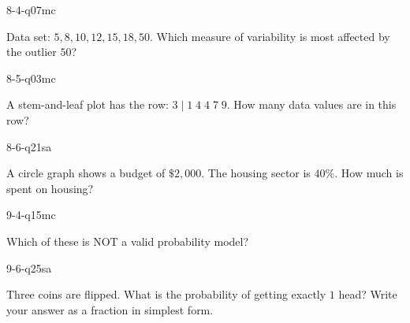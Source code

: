 \begin{practiceQuestion}{8-4-q07}{mc}
\begin{questionText}
Data set: $5, 8, 10, 12, 15, 18, 50$. Which measure of variability is most affected by the outlier $50$?
\end{questionText}
\end{practiceQuestion}

\begin{practiceQuestion}{8-5-q03}{mc}
\begin{questionText}
A stem-and-leaf plot has the row: $3 \mid 1\;4\;4\;7\;9$. How many data values are in this row?
\end{questionText}
\end{practiceQuestion}

\begin{practiceQuestion}{8-6-q21}{sa}
\begin{questionText}
A circle graph shows a budget of $\$2{,}000$. The housing sector is $40\%$. How much is spent on housing?
\end{questionText}
\end{practiceQuestion}

\begin{practiceQuestion}{9-4-q15}{mc}
\begin{questionText}
Which of these is NOT a valid probability model?
\end{questionText}
\end{practiceQuestion}

\begin{practiceQuestion}{9-6-q25}{sa}
\begin{questionText}
Three coins are flipped. What is the probability of getting exactly $1$ head? Write your answer as a fraction in simplest form.
\end{questionText}
\end{practiceQuestion}

